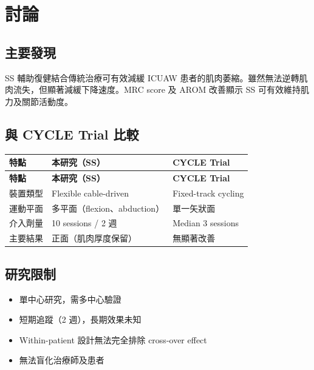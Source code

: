 \documentclass[11pt,a4paper]{article}
\begin{document}
\section{討論}

\subsection{主要發現}

SS 輔助復健結合傳統治療可有效減緩 ICUAW 患者的肌肉萎縮。雖然無法逆轉肌肉流失，但顯著減緩下降速度。MRC score 及 AROM 改善顯示 SS 可有效維持肌力及關節活動度。

\subsection{與 CYCLE Trial 比較}

\begin{longtable}{p{4cm}p{5cm}p{5cm}}
\toprule
\textbf{特點} & \textbf{本研究（SS）} & \textbf{CYCLE Trial} \\
\midrule
\endfirsthead
\toprule
\textbf{特點} & \textbf{本研究（SS）} & \textbf{CYCLE Trial} \\
\midrule
\endhead
裝置類型 & Flexible cable-driven & Fixed-track cycling \\
\midrule
運動平面 & 多平面（flexion、abduction） & 單一矢狀面 \\
\midrule
介入劑量 & 10 sessions / 2 週 & Median 3 sessions \\
\midrule
主要結果 & 正面（肌肉厚度保留） & 無顯著改善 \\
\bottomrule
\end{longtable}

\subsection{研究限制}

\begin{itemize}
    \item 單中心研究，需多中心驗證
    \item 短期追蹤（2 週），長期效果未知
    \item Within-patient 設計無法完全排除 cross-over effect
    \item 無法盲化治療師及患者
\end{itemize}

\end{document}
